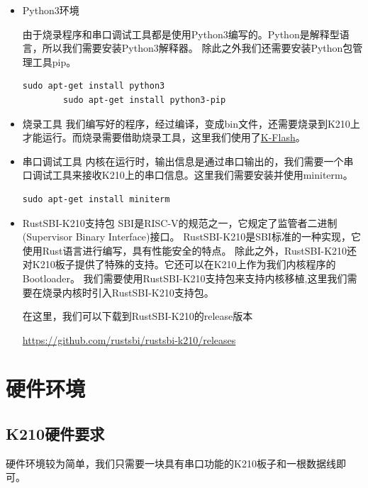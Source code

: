 \begin{itemize}
    \item Python3环境
    
    由于烧录程序和串口调试工具都是使用Python3编写的。Python是解释型语言，所以我们需要安装Python3解释器。
    除此之外我们还需要安装Python包管理工具pip。

    \begin{lstlisting}[caption={安装Python3环境}, label={lst:install_python3}]
        sudo apt-get install python3
        sudo apt-get install python3-pip
    \end{lstlisting}

    \item 烧录工具
    我们编写好的程序，经过编译，变成bin文件，还需要烧录到K210上才能运行。而烧录需要借助烧录工具，这里我们使用了\href{https://github.com/BITzga/riscv64-pke-k210/blob/master/compile_tool/kflash.py}{K-Flash}。
    \item 串口调试工具
    内核在运行时，输出信息是通过串口输出的，我们需要一个串口调试工具来接收K210上的串口信息。这里我们需要安装并使用miniterm。

    \begin{lstlisting}[caption={安装miniterm}, label={lst:install_miniterm}]
        sudo apt-get install miniterm
    \end{lstlisting}

    \item RustSBI-K210支持包
    SBI是RISC-V的规范之一，它规定了监管者二进制(Supervisor Binary Interface)接口。
    RustSBI-K210是SBI标准的一种实现，它使用Rust语言进行编写，具有性能安全的特点。
    除此之外，RustSBI-K210还对K210板子提供了特殊的支持。它还可以在K210上作为我们内核程序的Bootloader。
    我们需要使用RustSBI-K210支持包来支持内核移植,这里我们需要在烧录内核时引入RustSBI-K210支持包。

    在这里，我们可以下载到RustSBI-K210的release版本

    \href{https://github.com/rustsbi/rustsbi-k210/releases}{https://github.com/rustsbi/rustsbi-k210/releases}
    
\end{itemize}

\section{硬件环境}

\subsection{K210硬件要求}

硬件环境较为简单，我们只需要一块具有串口功能的K210板子和一根数据线即可。

